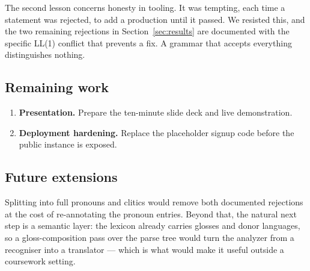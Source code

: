 The second lesson concerns honesty in tooling. It was tempting, each time a statement was
rejected, to add a production until it passed. We resisted this, and the two remaining
rejections in Section~\ref{sec:results} are documented with the specific LL(1) conflict that
prevents a fix. A grammar that accepts everything distinguishes nothing.

\subsection{Remaining work}

\begin{todobox}
\begin{enumerate}[leftmargin=1.4em, itemsep=0.2em]
  \item \textbf{Presentation.} Prepare the ten-minute slide deck and live demonstration.
  \item \textbf{Deployment hardening.} Replace the placeholder signup code before the
        public instance is exposed.
\end{enumerate}
\end{todobox}

\subsection{Future extensions}

Splitting  into full pronouns and clitics would remove both documented
rejections at the cost of re-annotating the pronoun entries. Beyond that, the natural next
step is a semantic layer: the lexicon already carries glosses and donor languages, so a
gloss-composition pass over the parse tree would turn the analyzer from a recogniser into a
translator --- which is what would make it useful outside a coursework setting.

